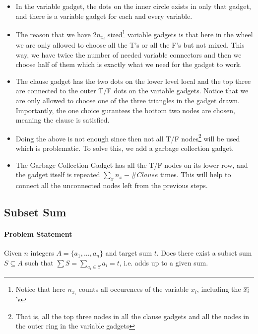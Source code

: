 \documentclass[10pt]{article}
\newcommand{\overbar}[1]{\mkern 1.5mu\overline{\mkern-1.5mu#1\mkern-1.5mu}\mkern 1.5mu}
\begin{document}
\begin{itemize}
    \item In the variable gadget, the dots on the inner circle exists in only that gadget, and there is a variable gadget for each and every variable.
    \item The reason that we have $2n_{x_i}$ sized\footnote{Notice that here $n_{x_i}$ counts all occurences of the variable $x_i$, including the $\overbar{x_i}$'s} variable gadgets is that here in the wheel we are only allowed to choose all the T's or all the F's but not mixed. This way, we have twice the number of needed variable connectors and then we choose half of them which is exactly what we need for the gadget to work. 
    \item The clause gadget has the two dots on the lower level local and the top three are connected to the outer T/F dots on the variable gadgets. Notice that we are only allowed to choose one of the three triangles in the gadget drawn. Importantly, the one choice gurantees the bottom two nodes are chosen, meaning the clause is satisfied. 
    \item Doing the above is not enough since then not all T/F nodes\footnote{That is, all the top three nodes in all the clause gadgets and all the nodes in the outer ring in the variable gadgets} will be used which is problematic. To solve this, we add a garbage collection gadget.
    \item The Garbage Collection Gadget has all the T/F nodes on its lower row, and the gadget itself is repeated $\sum_x n_x - \#Clause$ times. This will help to connect all the unconnected nodes left from the previous steps.  
\end{itemize}

\subsection{Subset Sum}
\paragraph{Problem Statement} Given $n$ integers $A = \{a_1, ..., a_n\}$ and target sum $t$. Does there exist a subset sum $S\subseteq A$ such that $\sum S = \sum_{a_i \in S} a_i = t$, i.e. adds up to a given sum.
\end{document}

